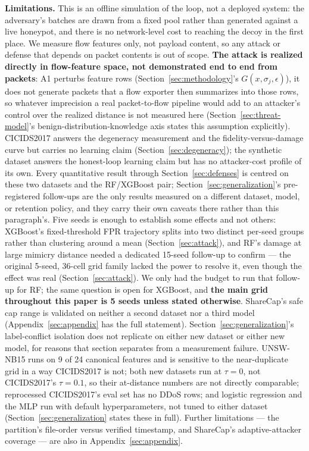 \textbf{Limitations.} This is an offline simulation of the loop, not a deployed system: the
adversary's batches are drawn from a fixed pool rather than generated against a live honeypot,
and there is no network-level cost to reaching the decoy in the first place. We measure flow
features only, not payload content, so any attack or defense that depends on packet contents is
out of scope. \textbf{The attack is realized directly in flow-feature space, not demonstrated
end to end from packets}: A1 perturbs feature rows (Section~\ref{sec:methodology}'s
$G(x,\sigma_j,\epsilon)$), it does not generate packets that a flow exporter then summarizes into
those rows, so whatever imprecision a real packet-to-flow pipeline would add to an attacker's
control over the realized distance is not measured here (Section~\ref{sec:threat-model}'s
benign-distribution-knowledge axis states this assumption explicitly). CICIDS2017 answers the
degeneracy measurement and the fidelity-versus-damage curve but carries no learning claim
(Section~\ref{sec:degeneracy}); the synthetic dataset answers the honest-loop learning claim but
has no attacker-cost profile of its own. Every quantitative result through Section~\ref{sec:defenses}
is centred on these two datasets and the RF/XGBoost pair; Section~\ref{sec:generalization}'s
pre-registered follow-ups are the only results measured on a different dataset, model, or
retention policy, and they carry their own caveats there rather than this paragraph's. Five seeds
is enough to establish some effects and not others: XGBoost's fixed-threshold FPR trajectory
splits into two distinct per-seed groups rather than clustering around a mean
(Section~\ref{sec:attack}), and RF's damage at large mimicry distance needed a dedicated 15-seed
follow-up to confirm — the original 5-seed, 36-cell grid family lacked the power to resolve it,
even though the effect was real (Section~\ref{sec:attack}). We only had the budget to run that
follow-up for RF; the same question is open for XGBoost, and \textbf{the main grid throughout
this paper is 5 seeds unless stated otherwise}. ShareCap's safe cap range is validated on neither
a second dataset nor a third model (Appendix~\ref{sec:appendix} has the full statement).
Section~\ref{sec:generalization}'s label-conflict isolation does not replicate on either new
dataset or either new model, for reasons that section separates from a measurement failure. UNSW-NB15
runs on 9 of 24 canonical features and is sensitive to the near-duplicate grid in a way CICIDS2017
is not; both new datasets run at $\tau=0$, not CICIDS2017's $\tau=0.1$, so their at-distance
numbers are not directly comparable; reprocessed CICIDS2017's eval set has no DDoS rows; and
logistic regression and the MLP run with default hyperparameters, not tuned to either dataset
(Section~\ref{sec:generalization} states these in full). Further limitations — the partition's
file-order versus verified timestamp, and ShareCap's adaptive-attacker coverage — are also in
Appendix~\ref{sec:appendix}.

